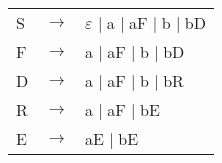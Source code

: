 \documentclass[a4paper]{exam}
\theoremstyle{remark}
\newenvironment{grammar}
	{\begin{tabular}[b]{lcl}}
	{\end{tabular}}
\newcommand{\rewritten}{$\to$}
\newcommand{\alternative}{$\mid \;$}
\begin{document}
\begin{questions}
	\begin{solution}
		
		\begin{grammar}
			S & \rewritten & $\varepsilon$ \alternative a \alternative aF \alternative b \alternative bD \\
			F & \rewritten & a \alternative aF \alternative b \alternative bD \\
			D & \rewritten & a \alternative aF \alternative b \alternative bR \\
			R & \rewritten & a \alternative aF \alternative bE \\
			E & \rewritten & aE \alternative bE
		\end{grammar}
		
	\end{solution}
	
\end{questions}
\end{document}
